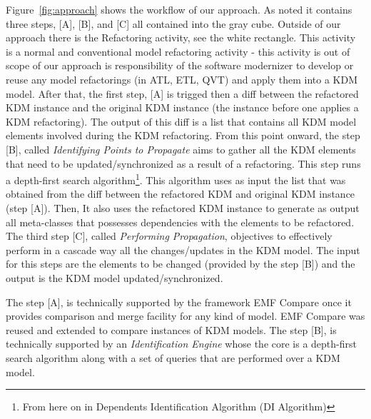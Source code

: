 %
Figure~\ref{fig:approach} shows the workflow of our approach. As noted it contains three steps, [A], [B], and [C] all contained into the gray cube. Outside of our approach there is the Refactoring activity, see the white rectangle. This activity is a normal and conventional model refactoring activity - this activity is out of scope of our approach is responsibility of the software modernizer to develop or reuse any model refactorings (in ATL, ETL, QVT) and apply them into a KDM model. %
After that, the first step, [A] is trigged then a diff between the refactored KDM instance and the original KDM instance (the instance before one applies a KDM refactoring). The output of this diff is a list that contains all KDM model elements involved during the KDM refactoring. %
From this point onward, the step [B], called \textit{Identifying Points to Propagate} aims to gather all the KDM elements that need to be updated/synchronized as a result of a refactoring. %
This step runs a depth-first search algorithm\footnote{From here on in Dependents Identification Algorithm (DI Algorithm)}. This algorithm uses as input the list that was obtained from the diff between the refactored KDM and original KDM instance (step [A]).
Then, It also uses the refactored KDM instance to generate as output all meta-classes that possesses dependencies with the elements to be refactored. The third step [C], called \textit{Performing Propagation}, objectives to effectively perform in a cascade way all the changes/updates in the KDM model. The input for this steps are the elements to be changed (provided by the step [B]) and the output is the KDM model updated/synchronized. 

The step [A], is technically supported by the framework EMF Compare once it provides comparison and merge facility for any kind of model. EMF Compare was reused and extended to compare instances of KDM models. The step [B], is technically supported by an \textit{Identification Engine} whose the core is a depth-first search algorithm along with a set of queries that are performed over a KDM model. %

